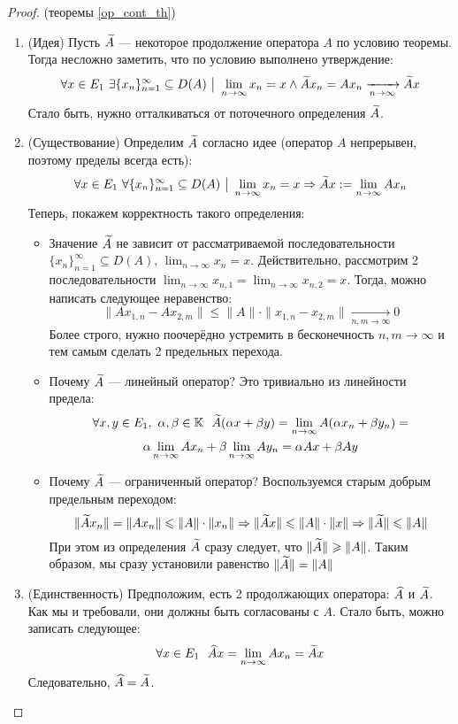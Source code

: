 \begin{proof} (теоремы \ref{op_cont_th})
	\begin{enumerate}
		\item (Идея) Пусть $\widetilde{A}$ --- некоторое продолжение оператора $A$ по условию теоремы. Тогда несложно заметить, что по условию выполнено утверждение:
		\[
		\forall x \in E_1\ \exists \{x_n\}_{n = 1}^\infty \subseteq D(A) \ \big|\  \lim_{n \to \infty} x_n = x \wedge \widetilde{A}x_n = Ax_n \xrightarrow[n \to \infty]{} \widetilde{A}x
		\]
		Стало быть, нужно отталкиваться от поточечного определения $\widetilde{A}$.
		
		\item (Существование) Определим $\widetilde{A}$ согласно идее (оператор $A$ непрерывен, поэтому пределы всегда есть):
		\[
		\forall x \in E_1\ \forall \{x_n\}_{n = 1}^\infty \subseteq D(A) \ \big|\  \lim_{n \to \infty} x_n = x \Rightarrow \widetilde{A}x := \lim_{n \to \infty} Ax_n
		\]
		Теперь, покажем корректность такого определения:
		\begin{itemize}
			\item Значение $\widetilde{A}$ не зависит от рассматриваемой последовательности $\{x_n\}_{n = 1}^\infty \subseteq D(A)$, $\lim_{n \to \infty} x_n = x$. Действительно, рассмотрим 2 последовательности $\lim_{n \to \infty} x_{n, 1} = \lim_{n \to \infty} x_{n, 2} = x$. Тогда, можно написать следующее неравенство:
			\[
			\|Ax_{1, n} - Ax_{2, m}\| \le \|A\| \cdot \|x_{1, n} - x_{2, m}\| \xrightarrow[n, m \to \infty]{} 0
			\]
			Более строго, нужно поочерёдно устремить в бесконечность $n, m \to \infty$ и тем самым сделать 2 предельных перехода.
			
			\item Почему $\widetilde{A}$ --- линейный оператор? Это тривиально из линейности предела:
			\begin{multline*}
			\forall x, y \in E_1,\ \alpha, \beta \in \K\ \ \wdt{A}(\alpha x + \beta y) = \lim_{n \to \infty} A(\alpha x_n + \beta y_n) =
			\\
			\alpha \lim_{n \to \infty} Ax_n + \beta \lim_{n \to \infty} Ay_n = \alpha Ax + \beta Ay
			\end{multline*}
			
			\item Почему $\widetilde{A}$ --- ограниченный оператор? Воспользуемся старым добрым предельным переходом:
			\[
			\|\widetilde{A}x_n\| = \|Ax_n\| \leqslant \|A\| \cdot \|x_n\| \Rightarrow \|\widetilde{A}x\| \leqslant \|A\| \cdot \|x\| \Rightarrow \|\widetilde{A}\| \leqslant \|A\|
			\]
			При этом из определения $\widetilde{A}$ сразу следует, что $\|\widetilde{A}\| \geqslant \|A\|$. Таким образом, мы сразу установили равенство $\|\widetilde{A}\| = \|A\|$
		\end{itemize}
		
		\item (Единственность) Предположим, есть 2 продолжающих оператора: $\widehat{A}$ и $\widetilde{A}$. Как мы и требовали, они должны быть согласованы с $A$. Стало быть, можно записать следующее:
		\[
		\forall x \in E_1\ \ \widehat{A}x = \lim_{n \to \infty} Ax_n = \widetilde{A}x
		\]
		Следовательно, $\widehat{A} = \widetilde{A}$.
	\end{enumerate}
\end{proof}

